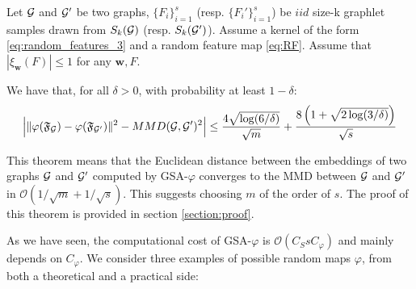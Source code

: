 \begin{theorem}
\label{theorem:concentration}
Let $\mathcal{G}$ and $\mathcal{G}'$ be two graphs, $\{F_i\}_{i=1}^{s}$ (resp. $\{F_i'\}_{i=1}^{s}$) be $iid$ size-k graphlet samples drawn from $S_k(\mathcal{G})$ (resp. $S_k(\mathcal{G}')$). Assume a kernel of the form \eqref{eq:random_features_3} and a random feature map \eqref{eq:RF}. Assume that $|\xi_\mathbf{w}(F)| \leq 1$ for any $\mathbf{w},F$.

We have that, for all $\delta>0$, with probability at least $1-\delta$:
\begin{align*}
 \Big|\|\varphi(\mathfrak{F}_{\mathcal{G}}) - \varphi(\mathfrak{F}_{\mathcal{G}'})\|^2 - MMD(\mathcal{G},\mathcal{G}')^2 \Big| \leq \frac{4 \sqrt{\log (6/\delta)}}{\sqrt{m}} + \frac{8\left(1+\sqrt{2\log(3/\delta)}\right)}{\sqrt{{s}}}
\end{align*}
\end{theorem}
This theorem means that the Euclidean distance between the embeddings of two graphs $\mathcal{G}$ and $\mathcal{G}'$ computed by GSA-$\varphi$ converges to the MMD between $\mathcal{G}$ and $\mathcal{G}'$ in $\mathcal{O}(1/\sqrt{m} + 1/\sqrt{s})$. This suggests choosing $m$ of the order of $s$. The proof of this theorem is provided in section \ref{section:proof}.

As we have seen, the computational cost of GSA-$\varphi$ is $\mathcal{O}(C_S s C_\varphi)$ and mainly depends on $C_\varphi$. We consider three examples of possible random maps $\varphi$, from both a theoretical and a practical side:

